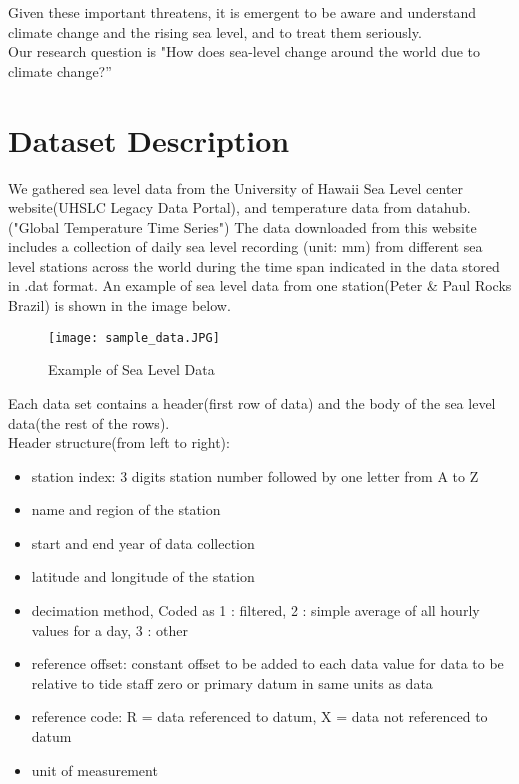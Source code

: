 \documentclass[fontsize=11pt]{article}
\begin{document}
    Given these important threatens, it is emergent to be aware and understand climate change and the rising sea level, and to treat them seriously.\\

    Our research question is "How does sea-level change around the world due to climate change?”

    \newpage
    \section*{Dataset Description}
    We gathered sea level data from the University of Hawaii Sea Level center website(UHSLC Legacy Data Portal), and temperature data from datahub. ("Global Temperature Time Series") The data downloaded from this website includes a collection of daily sea level recording (unit: mm) from different sea level stations across the world during the time span indicated in the data stored in .dat format. An example of sea level data from one station(Peter \& Paul Rocks Brazil) is shown in the image below.

    \begin{figure}[h!]
        \centering
        \texttt{[image: sample\_data.JPG]}
        \caption{Example of Sea Level Data}
        \label{fig:sample_data.JPG}
    \end{figure}

    Each data set contains a header(first row of data) and the body of the sea level data(the rest of the rows).\\

    Header structure(from left to right):
    \begin{itemize}
        \item
        station index: 3 digits station number followed by one letter from A to Z
        \item
        name and region of the station
        \item
        start and end year of data collection
        \item
        latitude and longitude of the station
        \item
        decimation method, Coded as
        1 : filtered,
        2 : simple average of all hourly values for a day,
        3 : other
        \item
        reference offset: constant offset to be added to each data value for data to be relative to tide staff zero or primary datum in same units as data
        \item
        reference code: R = data referenced to datum,
        X = data not referenced to datum
        \item
        unit of measurement
    \end{itemize}
\end{document}
